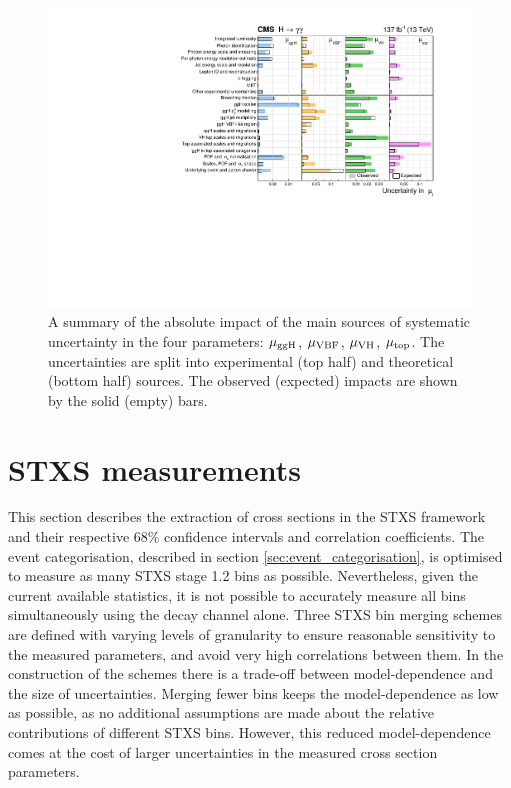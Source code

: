 \begin{figure}[htb!]
  \centering
  \includegraphics[width=1\textwidth]{Figures/hgg_results/mu_systematics.pdf}
  \caption[Impact of systematic uncertainty sources on the per-production mode signal strengths]
  {
    A summary of the absolute impact of the main sources of systematic uncertainty in the four parameters: $\mu_{\rm{ggH}}$, $\mu_{\rm{VBF}}$, $\mu_{\rm{VH}}$, $\mu_{\rm{top}}$. The uncertainties are split into experimental (top half) and theoretical (bottom half) sources. The observed (expected) impacts are shown by the solid (empty) bars.
  }
  \label{fig:syst_mu}
\end{figure}

\FloatBarrier
\section{STXS measurements}\label{sec:results_STXS}
This section describes the extraction of cross sections in the STXS framework and their respective 68\% confidence intervals and correlation coefficients. The event categorisation, described in section \ref{sec:event_categorisation}, is optimised to measure as many STXS stage 1.2 bins as possible. Nevertheless, given the current available statistics, it is not possible to accurately measure all bins simultaneously using the \Hgg decay channel alone. Three STXS bin merging schemes are defined with varying levels of granularity to ensure reasonable sensitivity to the measured parameters, and avoid very high correlations between them. In the construction of the schemes there is a trade-off between model-dependence and the size of uncertainties. Merging fewer bins keeps the model-dependence as low as possible, as no additional assumptions are made about the relative contributions of different STXS bins. However, this reduced model-dependence comes at the cost of larger uncertainties in the measured cross section parameters.

